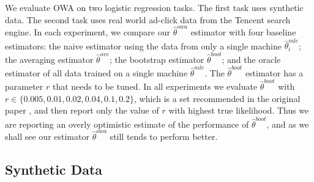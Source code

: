\documentclass[twoside]{article}
\newcommand{\w}{\theta}
\newcommand{\wowa}{\hat\w^{owa}}
\newcommand{\wave}{\hat\w^{ave}}
\newcommand{\wboot}{\hat\w^{boot}}
\newcommand{\wmle}{\hat\w^{mle}}
\begin{document}
We evaluate OWA on two logistic regression tasks.
The first task uses synthetic data.
The second task uses real world ad-click data from the Tencent search engine.
In each experiment, we compare our $\wowa$ estimator with four baseline estimators:
the naive estimator using the data from only a single machine $\wmle_i$;
the averaging estimator $\wave$;
the bootstrap estimator $\wboot$;
and the oracle estimator of all data trained on a single machine $\wmle$.
The $\wboot$ estimator has a parameter $r$ that needs to be tuned.
In all experiments we evaluate $\wboot$ with $r \in \{0.005,0.01,0.02,0.04,0.1,0.2\}$,
which is a set recommended in the original paper \citep{zhang2012communication},
and then report only the value of $r$ with highest true likelihood.
Thus we are reporting an overly optimistic estimate of the performance of $\wboot$,
and as we shall see our estimator $\wowa$ still tends to perform better.

\subsection{Synthetic Data}
\end{document}
